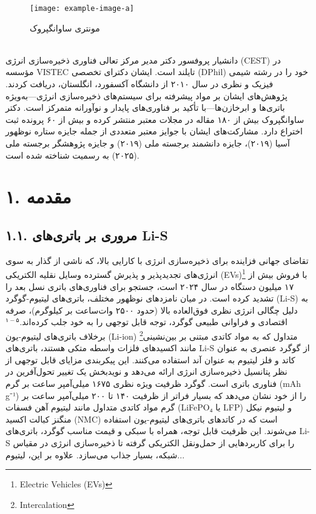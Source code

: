 \documentclass[12pt,a4paper,twocolumn]{article} %
\newcommand{\persian}[1]{\textfarsi{#1}}
\newcommand{\english}[1]{\textenglish{#1}}
\newcommand{\farsibold}[1]{{\farsifontbold{#1}}}
\begin{document}
\begin{figure}[h]
    \centering
    \texttt{[image: example-image-a]} %
    \caption*{\persian{مونتری ساوانگپروک}}
\end{figure}

\persian{
\farsibold{زندگی‌نامه نویسنده:} \\
دانشیار پروفسور دکتر \farsibold{مونتری ساوانگپروک} مدیر مرکز تعالی فناوری ذخیره‌سازی انرژی (CEST) در مؤسسه VISTEC تایلند است. ایشان دکترای تخصصی (\english{DPhil}) خود را در رشته شیمی فیزیک و نظری در سال ۲۰۱۰ از دانشگاه آکسفورد، انگلستان، دریافت کردند. پژوهش‌های ایشان بر مواد پیشرفته برای سیستم‌های ذخیره‌سازی انرژی—به‌ویژه باتری‌ها و ابرخازن‌ها—با تأکید بر فناوری‌های پایدار و نوآورانه متمرکز است. دکتر ساوانگپروک بیش از ۱۸۰ مقاله در مجلات معتبر منتشر کرده و بیش از ۶۰ پرونده ثبت اختراع دارد. مشارکت‌های ایشان با جوایز معتبر متعددی از جمله جایزه ستاره نوظهور آسیا (۲۰۱۹)، جایزه دانشمند برجسته ملی (۲۰۱۹) و جایزه پژوهشگر برجسته ملی (۲۰۲۵) به رسمیت شناخته شده است.
}
\vspace{1cm}

\section*{\persian{۱. مقدمه}}
\subsection*{\persian{۱.۱. مروری بر باتری‌های \english{Li-S}}}

\persian{
تقاضای جهانی فزاینده برای ذخیره‌سازی انرژی با کارایی بالا، که ناشی از گذار به سوی انرژی‌های تجدیدپذیر و پذیرش گسترده وسایل نقلیه الکتریکی (EVs)\footnote{\english{Electric Vehicles (EVs)}} با فروش بیش از ۱۷ میلیون دستگاه در سال ۲۰۲۴ است، جستجو برای فناوری‌های باتری نسل بعد را تشدید کرده است. در میان نامزدهای نوظهور مختلف، باتری‌های لیتیوم-گوگرد (\english{Li-S}) به دلیل چگالی انرژی نظری فوق‌العاده بالا (حدود ۲۵۰۰ وات‌ساعت بر کیلوگرم)، صرفه اقتصادی و فراوانی طبیعی گوگرد، توجه قابل توجهی را به خود جلب کرده‌اند.$^{۱-۵}$ برخلاف باتری‌های لیتیوم-یون (\english{Li-ion}) متداول که به مواد کاتدی مبتنی بر بین‌نشینی\footnote{\english{Intercalation}} مانند اکسیدهای فلزات واسطه متکی هستند، باتری‌های \english{Li-S} از گوگرد عنصری به عنوان کاتد و فلز لیتیوم به عنوان آند استفاده می‌کنند. این پیکربندی مزایای قابل توجهی از نظر پتانسیل ذخیره‌سازی انرژی ارائه می‌دهد و نویدبخش یک تغییر تحول‌آفرین در فناوری باتری است.
}
\persian{
گوگرد ظرفیت ویژه نظری ۱۶۷۵ میلی‌آمپر ساعت بر گرم (\english{mAh g⁻¹}) را از خود نشان می‌دهد که بسیار فراتر از ظرفیت ۱۴۰ تا ۲۰۰ میلی‌آمپر ساعت بر گرم مواد کاتدی متداول مانند لیتیوم آهن فسفات (\english{LiFePO₄} یا \english{LFP}) و لیتیوم نیکل منگنز کبالت اکسید (\english{NMC}) است که در کاتدهای باتری‌های لیتیوم-یون استفاده می‌شوند. این ظرفیت قابل توجه، همراه با سبکی و قیمت مناسب گوگرد، باتری‌های \english{Li-S} را برای کاربردهایی از حمل‌ونقل الکتریکی گرفته تا ذخیره‌سازی انرژی در مقیاس شبکه، بسیار جذاب می‌سازد. علاوه بر این، لیتیوم...
}
\end{document}

